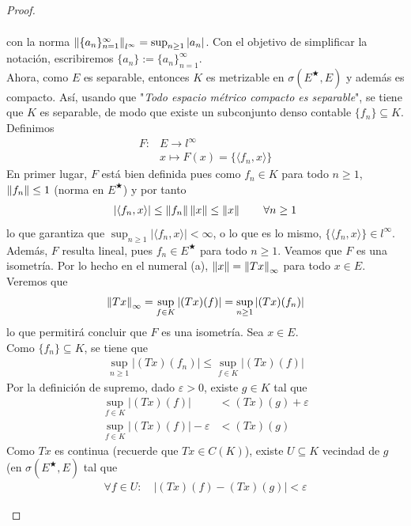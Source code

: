 \begin{proof}
\begin{enumerate}
\begin{align*}
    \end{align*}
    con la norma $\left\|\{a_n\}_{n=1}^{\infty}\right\|_{l^{\infty}}=\sup_{n\geq 1}|a_n|$. Con el objetivo de simplificar la notación, escribiremos $\{a_n\}:=\{a_n\}_{n=1}^{\infty}$. \\
    Ahora, como $E$ es separable, entonces $K$ es metrizable en $\sigma(E^{\bigstar},E)$ y además es compacto. Así, usando que "\textit{Todo espacio métrico compacto es separable}", se tiene que $K$ es separable, de modo que existe un subconjunto denso contable $\{f_n\}\subseteq K $. Definimos
    \begin{align*}
        F:&E\longrightarrow l^{\infty} \\ &x \longmapsto F(x)=\{\langle f_n,x\rangle\}
    \end{align*}
    En primer lugar, $F$ está bien definida pues como $f_n \in K$ para todo $n\geq1$, $\left\|f_n\right\|\leq 1$ (norma en $E^{\bigstar}$) y por tanto
    \begin{align*}
        |\langle f_n,x\rangle|\leq \left\|f_n\right\|\left\|x\right\| \leq \left\|x\right\| \qquad \forall n\geq1
    \end{align*}
    lo que garantiza que $\sup_{n\geq 1}|\langle f_n,x\rangle|<\infty$, o lo que es lo mismo, $\{\langle f_n,x\rangle\} \in l^{\infty}$. Además, $F$ resulta lineal, pues $f_n \in E^{\bigstar}$ para todo $n\geq 1$. Veamos que $F$ es una isometría. Por lo hecho en el numeral (a), $\left\|x\right\|=\left\|Tx\right\|_{\infty}$ para todo $x\in E$. Veremos que 
    \begin{align*}
        \left\|Tx\right\|_{\infty}=\sup_{f\in K}|(Tx)(f)|=\sup_{n\geq 1}|(Tx)(f_n)|
    \end{align*}
    lo que permitirá concluir que $F$ es una isometría. Sea $x\in E$.
    \\
    \checkmark Como $\{f_n\}\subseteq K$, se tiene que
    \begin{align*}
        \sup_{n\geq 1}|(Tx)(f_n)| \leq \sup_{f\in K}|(Tx)(f)|
    \end{align*}
    \checkmark Por la definición de supremo, dado $\varepsilon>0$, existe $g \in K$ tal que
    \begin{align*}
    \sup_{f\in K}|(Tx)(f)|&<(Tx)(g)+\varepsilon \\
    \sup_{f\in K}|(Tx)(f)|-\varepsilon&<(Tx)(g)
    \end{align*}
    Como $Tx$ es continua (recuerde que $Tx \in C(K)$), existe $U\subseteq K$ vecindad de $g$ (en $\sigma(E^{\bigstar},E)$ tal que
    \begin{align*}
        \forall f \in U: \quad|(Tx)(f)-(Tx)(g)|<\varepsilon

\end{align*}
\end{enumerate}
\end{proof}
